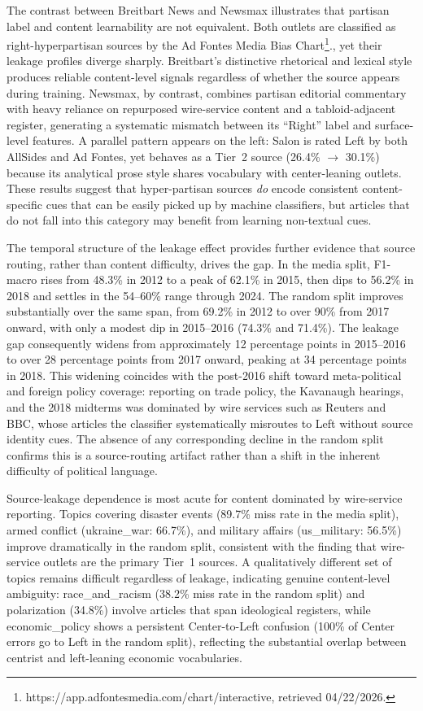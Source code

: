 The contrast between Breitbart News and Newsmax illustrates that partisan label and content learnability are not equivalent. Both outlets are classified as right-hyperpartisan sources by the Ad Fontes Media Bias Chart\footnote{https://app.adfontesmedia.com/chart/interactive, retrieved 04/22/2026.}., yet their leakage profiles diverge sharply. Breitbart's distinctive rhetorical and lexical style produces reliable content-level signals regardless of whether the source appears during training. Newsmax, by contrast, combines partisan editorial commentary with heavy reliance on repurposed wire-service content and a tabloid-adjacent register, generating a systematic mismatch between its ``Right'' label and surface-level features. A parallel pattern appears on the left: Salon is rated Left by both AllSides and Ad Fontes, yet behaves as a Tier~2 source (26.4\% $\to$ 30.1\%) because its analytical prose style shares vocabulary with center-leaning outlets. These results suggest that hyper-partisan sources \textit{do} encode consistent content-specific cues that can be easily picked up by machine classifiers, but articles that do not fall into this category may benefit from learning non-textual cues.

The temporal structure of the leakage effect provides further evidence that source routing, rather than content difficulty, drives the gap. In the media split, F1-macro rises from 48.3\% in 2012 to a peak of 62.1\% in 2015, then dips to 56.2\% in 2018 and settles in the 54--60\% range through 2024. The random split improves substantially over the same span, from 69.2\% in 2012 to over 90\% from 2017 onward, with only a modest dip in 2015--2016 (74.3\% and 71.4\%). The leakage gap consequently widens from approximately 12 percentage points in 2015--2016 to over 28 percentage points from 2017 onward, peaking at 34 percentage points in 2018. This widening coincides with the post-2016 shift toward meta-political and foreign policy coverage: reporting on trade policy, the Kavanaugh hearings, and the 2018 midterms was dominated by wire services such as Reuters and BBC, whose articles the classifier systematically misroutes to Left without source identity cues. The absence of any corresponding decline in the random split confirms this is a source-routing artifact rather than a shift in the inherent difficulty of political language.

Source-leakage dependence is most acute for content dominated by wire-service reporting. Topics covering disaster events (89.7\% miss rate in the media split), armed conflict (ukraine\_war: 66.7\%), and military affairs (us\_military: 56.5\%) improve dramatically in the random split, consistent with the finding that wire-service outlets are the primary Tier~1 sources. A qualitatively different set of topics remains difficult regardless of leakage, indicating genuine content-level ambiguity: race\_and\_racism (38.2\% miss rate in the random split) and polarization (34.8\%) involve articles that span ideological registers, while economic\_policy shows a persistent Center-to-Left confusion (100\% of Center errors go to Left in the random split), reflecting the substantial overlap between centrist and left-leaning economic vocabularies.

